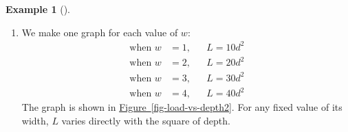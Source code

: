 \documentclass[10pt,]{book}
\theoremstyle{plain}
\theoremstyle{definition}
\theoremstyle{definition}
\theoremstyle{definition}
\newtheorem{example}[theorem]{Example}
\theoremstyle{definition}
\theoremstyle{definition}
\numberwithin{equation}{section}
\newcounter{figstack}
\newcounter{figindex}
\newlength\fight
\newcommand\pushValignCaptionBottom[5][b]{%
\stepcounter{figstack}%
\expandafter\def\csname %
figalign\romannumeral\value{figstack}\endcsname{#1}%
\expandafter\def\csname %
figtype\romannumeral\value{figstack}\endcsname{#2}%
\expandafter\def\csname %
figwd\romannumeral\value{figstack}\endcsname{#3}%
\expandafter\def\csname %
figcontent\romannumeral\value{figstack}\endcsname{#4}%
\expandafter\def\csname %
figcap\romannumeral\value{figstack}\endcsname{#5}%
\setbox0=\hbox{%
\begin{#2}{#3}#4\end{#2}}%
\ifdim\dimexpr\ht0+\dp0\relax>\fight\global\setlength{\fight}{%
\dimexpr\ht0+\dp0\relax}\fi%
}
\newcommand\popValignCaptionBottom{%
\setcounter{figindex}{0}%
\hfill%
\whiledo{\value{figindex}<\value{figstack}}{%
\stepcounter{figindex}%
\def\tmp{\csname figwd\romannumeral\value{figindex}\endcsname}%
\begin{\csname figtype\romannumeral\value{figindex}\endcsname}[t]{\tmp}%
\centering%
\stackinset{c}{}%
{\csname figalign\romannumeral\value{figindex}\endcsname}{}%
{\csname figcontent\romannumeral\value{figindex}\endcsname}%
{\rule{0pt}{\fight}}\par%
\csname figcap\romannumeral\value{figindex}\endcsname%
\end{\csname figtype\romannumeral\value{figindex}\endcsname}%
\hfill%
}%
\setcounter{figstack}{0}%
\setlength{\fight}{0pt}%
\hfill%
}
\newcommand{\amp}{ & }
\begin{document}
\begin{example}[]
\begin{enumerate}[label=*\alph**]
\item\hypertarget{li-589}{}
        We make one graph for each value of \(w\):
        \begin{align*}
        \text{when } w \amp= 1, \amp\amp L = 10d^2 \\
        \text{when } w \amp= 2, \amp\amp L = 20d^2 \\
        \text{when } w \amp= 3, \amp\amp L = 30d^2 \\
        \text{when } w \amp= 4, \amp\amp L = 40d^2
        \end{align*}
        The graph is shown in \hyperref[fig-load-vs-depth2]{Figure~\ref{fig-load-vs-depth2}}. For any fixed value of its width, \(L\) varies directly with the square of depth.
    \end{enumerate}

%
\end{example}
\end{document}
